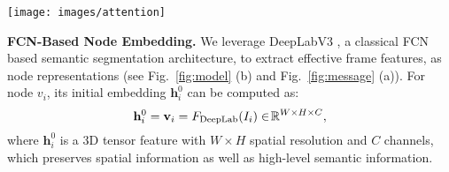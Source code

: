 \documentclass[10pt,twocolumn,letterpaper]{article}
\begin{document}
\begin{figure*}[t]
\centering
      \texttt{[image: images/attention]}
\vspace{-22pt}
\caption{\small Detailed illustration of our (a) node embedding, (b) intra-attention based loop-edge embedding and corresponding loop-message generation, (c) inter-attention based straight-edge embedding and corresponding neighbor message generation. }\label{fig:message}
\vspace{-12pt}
\end{figure*}



\noindent\textbf{FCN-Based Node Embedding.} We leverage DeepLabV3 \cite{DBLP:journals/corr/ChenPSA17}, a classical FCN based semantic segmentation architecture, to extract effective frame features, as node representations  (see Fig.~\ref{fig:model} (b) and Fig.~\ref{fig:message} (a)). For node $v_i$, its initial embedding $\mathbf{h}^0_i$ can be computed as:
	\vspace*{-4pt}
\begin{equation}
\mathbf{h}^0_i=\mathbf{v}_i=F_{\text{DeepLab}}(I_i)\in\!\mathbb{R}^{W\times H \times C},
	\vspace*{-4pt}
\end{equation}
where $\mathbf{h}^0_i$ is a 3D tensor feature with $W\!\times\!H$ spatial resolution and $C$ channels, which preserves spatial information as well as high-level semantic information.
\end{document}
